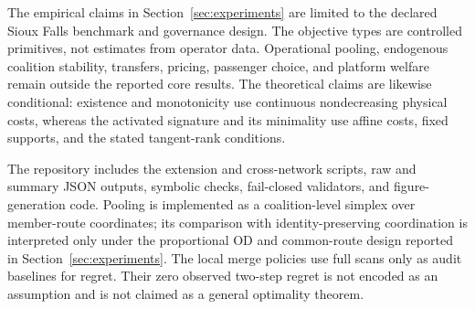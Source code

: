 The empirical claims in Section~\ref{sec:experiments} are limited to the declared Sioux Falls benchmark and governance design. The objective types are controlled primitives, not estimates from operator data. Operational pooling, endogenous coalition stability, transfers, pricing, passenger choice, and platform welfare remain outside the reported core results. The theoretical claims are likewise conditional: existence and monotonicity use continuous nondecreasing physical costs, whereas the activated signature and its minimality use affine costs, fixed supports, and the stated tangent-rank conditions.

The repository includes the extension and cross-network scripts, raw and
summary JSON outputs, symbolic checks, fail-closed validators, and
figure-generation code. Pooling is implemented as a coalition-level simplex
over member-route coordinates; its comparison with identity-preserving
coordination is interpreted only under the proportional OD and common-route
design reported in Section~\ref{sec:experiments}. The local merge policies use
full scans only as audit baselines for regret. Their zero observed two-step
regret is not encoded as an assumption and is not claimed as a general
optimality theorem.
